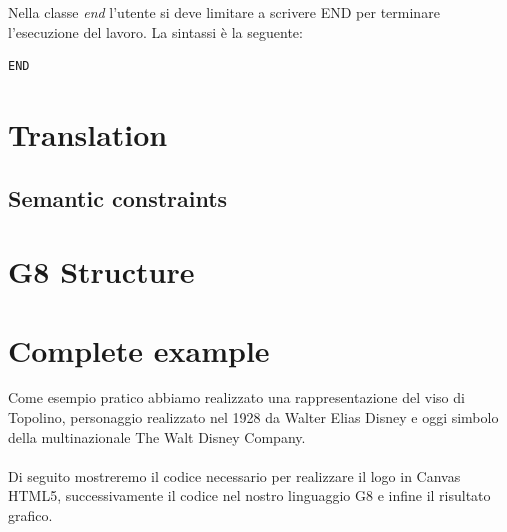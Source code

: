 \documentclass[a4paper]{article}
\begin{document}
Nella classe \textit{end} l’utente si deve limitare a scrivere END per terminare l’esecuzione del lavoro. La sintassi è la seguente:
\begin{verbatim}
END
\end{verbatim}

\newpage

\section{Translation}

\subsection{Semantic constraints}

\newpage

\section{G8 Structure}

\newpage

\section{Complete example}
Come esempio pratico abbiamo realizzato una rappresentazione del viso di Topolino, personaggio realizzato nel 1928 da Walter Elias Disney e oggi simbolo della multinazionale The Walt Disney Company.
\\
\\
Di seguito mostreremo il codice necessario per realizzare il logo in Canvas HTML5, successivamente il codice nel nostro linguaggio G8 e infine il risultato grafico.
\end{document}
